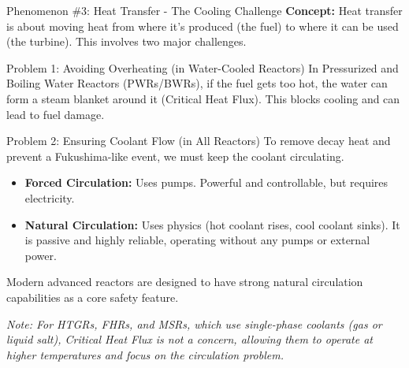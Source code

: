 \documentclass[aspectratio=169]{beamer}
\begin{document}
\begin{frame}[allowframebreaks]{Phenomenon \#3: Heat Transfer - The Cooling Challenge}
    \textbf{Concept:} Heat transfer is about moving heat from where it's produced (the fuel) to where it can be used (the turbine). This involves two major challenges.

    \vspace{1em}
    \begin{alertblock}{Problem 1: Avoiding Overheating (in Water-Cooled Reactors)}
        In Pressurized and Boiling Water Reactors (PWRs/BWRs), if the fuel gets too hot, the water can form a steam blanket around it (Critical Heat Flux). This blocks cooling and can lead to fuel damage.
    \end{alertblock}
    
    \vspace{1em}
    \begin{exampleblock}{Problem 2: Ensuring Coolant Flow (in All Reactors)}
        To remove decay heat and prevent a Fukushima-like event, we must keep the coolant circulating.
        \begin{itemize}
            \item \textbf{Forced Circulation:} Uses pumps. Powerful and controllable, but requires electricity.
            \item \textbf{Natural Circulation:} Uses physics (hot coolant rises, cool coolant sinks). It is passive and highly reliable, operating without any pumps or external power.
        \end{itemize}
        Modern advanced reactors are designed to have strong natural circulation capabilities as a core safety feature.
    \end{exampleblock}
    
    \textit{Note: For HTGRs, FHRs, and MSRs, which use single-phase coolants (gas or liquid salt), Critical Heat Flux is not a concern, allowing them to operate at higher temperatures and focus on the circulation problem.}
\end{frame}
\end{document}
